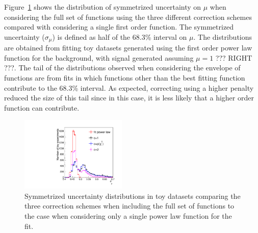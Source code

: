 Figure~\ref{fig:correction:compareerrors} shows the distribution of symmetrized uncertainty on $\mu$ 
when considering the full set of functions using the three different correction schemes compared  
with considering a single first order function. The symmetrized uncertainty ($\sigma_{\mu}$) 
is defined as half of the 68.3\% interval on $\mu$. 
The distributions are obtained from fitting 
toy datasets generated using the first order power law function for the background, with 
signal generated assuming $\mu=1$ ??? RIGHT ???. The tail of the distributions observed 
when considering the envelope of functions are from fits in which functions other than the 
best fitting function contribute to the 68.3\% interval. As expected, correcting using a higher 
penalty reduced the size of this tail since in this case, it is less likely that a higher order 
function can contribute.
 
\begin{figure}[tbp]
\centering
\includegraphics[width=0.45\textwidth]{correction/compare_error_magnitude.pdf}
\caption{Symmetrized uncertainty distributions in toy datasets comparing the three correction schemes 
when including the full set of functions 
to the case when considering only a single power law function for the fit.}
\label{fig:correction:compareerrors}
\end{figure}


